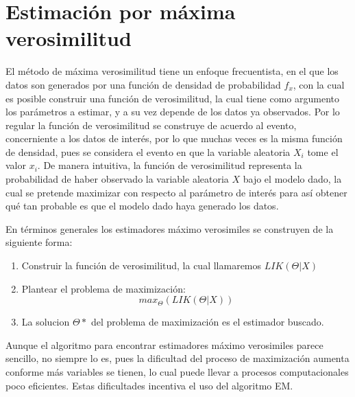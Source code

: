 
\chapter{Estimación por máxima verosimilitud}
El método de máxima verosimilitud tiene un enfoque frecuentista, en el que los datos son generados por una función de densidad de probabilidad $f_{x}$, con la cual 
es posible construir una función de verosimilitud, la cual tiene como argumento los parámetros a estimar, y a su vez depende de los datos ya observados. Por lo regular la función de verosimilitud se construye de acuerdo al evento, concerniente a los datos de interés, por lo que muchas veces es la misma función de densidad, pues se considera el evento en que la variable aleatoria $X_{i}$ tome el valor $x_{i}$. De manera intuitiva, la función de verosimilitud representa la probabilidad de haber observado la variable aleatoria $X$ bajo el modelo dado, la cual se pretende maximizar con respecto al parámetro de interés para así obtener qué tan probable es que el modelo dado haya generado los datos.

En términos generales los estimadores máximo verosimiles se construyen de la siguiente forma:
\begin{enumerate}
	\item Construir la función de verosimilitud, la cual llamaremos $LIK(\Theta|X)$
	\item Plantear el problema de maximización:  
\begin{equation*}
max_{\Theta}(LIK(\Theta|X))
\end{equation*} 
\item La solucion $\Theta *$ del problema de maximización es el estimador buscado.
\end{enumerate}

Aunque el algoritmo para encontrar estimadores máximo verosimiles parece sencillo, no siempre lo es, pues la dificultad del proceso de maximización aumenta conforme más variables se tienen, lo cual puede llevar a procesos computacionales poco eficientes. Estas dificultades incentiva el uso del algoritmo EM.
